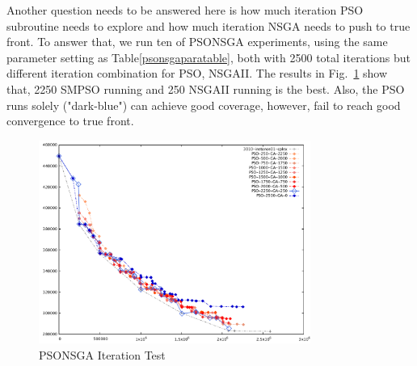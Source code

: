 \documentclass[10pt,journal,compsoc]{IEEEtran}
\newcommand{\Fig}[1]{Fig.~\ref{#1}}
\begin{document}
\begin{table}[ht]
\caption{PSONSGA Parameter Selection}
\label{psonsgaparatable}
\centering
{}
\end{table}
Another question needs to be answered here is how much iteration PSO subroutine needs to explore and how much iteration NSGA needs to push to true front. 
To answer that, we run ten of PSONSGA experiments, using the same parameter setting as Table\ref{psonsgaparatable}, both with 2500 total iterations but different iteration combination for PSO, NSGAII. The results in \Fig{psonsgaitertest} show that, 2250 SMPSO running and 250 NSGAII running is the best. Also, the PSO runs solely ("dark-blue") can achieve good coverage, however, fail to reach good convergence to true front. 
\begin{figure}[H]
\centerline{\includegraphics[page=1,width=3.5in]{PSONSGAII_SettingTest.pdf}}
\caption{PSONSGA Iteration Test} 
\label{psonsgaitertest}
\end{figure}
\end{document}
